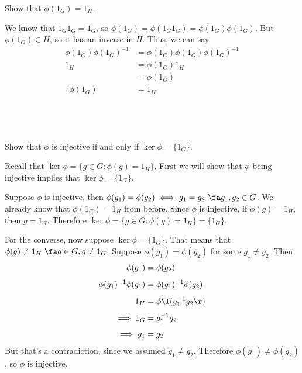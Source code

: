 \documentclass[a4paper]{article}
\begin{document}
\begin{questionbody}
Show that $\phi(1_G) = 1_H$.
\end{questionbody}

We know that $1_G 1_G = 1_G$, so $\phi(1_G) = \phi(1_G 1_G) = \phi(1_G) \phi(1_G)$. But $\phi(1_G) \in H$, so it has an inverse in $H$. Thus, we can say \begin{align*}
	\phi(1_G) \phi(1_G)^{-1} &= \phi(1_G) \phi(1_G) \phi(1_G)^{-1}\\[1ex]
	1_H &= \phi(1_G) 1_H\\[1ex]
		&= \phi(1_G)\\[1ex]
	\therefore \phi(1_G) &= 1_H
\end{align*}

\subsection{~} %

\begin{questionbody}
Show that $\phi$ is injective if and only if $\ker \phi = \{1_G\}$.
\end{questionbody}

Recall that $\ker \phi = \{g \in G : \phi(g) = 1_H\}$. First we will show that $\phi$ being injective implies that $\ker \phi = \{1_G\}$.

Suppose $\phi$ is injective, then $\phi(g_1) = \phi(g_2) \iff g_1 = g_2\ \fa g_1, g_2 \in G$. We already know that $\phi(1_G) = 1_H$ from before. Since $\phi$ is injective, if $\phi(g) = 1_H$, then $g = 1_G$. Therefore $\ker \phi = \{g \in G : \phi(g) = 1_H\} = \{1_G\}$.

For the converse, now suppose $\ker \phi = \{1_G\}$. That means that $\phi(g) \ne 1_H\ \fa g \in G, g \ne 1_G$. Suppose $\phi(g_1) = \phi(g_2)$ for some $g_1 \ne g_2$. Then \begin{align*}
	\phi(g_1) &= \phi(g_2)\\[1ex]
	\phi(g_1)^{-1} \phi(g_1) &= \phi(g_1)^{-1} \phi(g_2)\\[1ex]
	1_H &= \phi\l(g_1^{-1} g_2\r)\\[1ex]
	\implies 1_G &= g_1^{-1} g_2\\[1ex]
	\implies g_1 &= g_2
\end{align*}
But that's a contradiction, since we assumed $g_1 \ne g_2$. Therefore $\phi(g_1) \ne \phi(g_2)$, so $\phi$ is injective.

\newpage
\subsection{~} %
\end{document}
